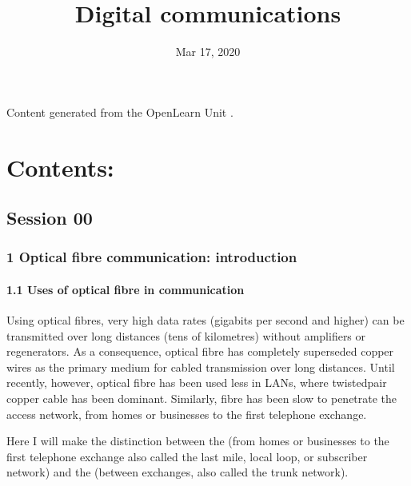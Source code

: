 \documentclass[letterpaper,10pt,english]{sphinxmanual}
\title{Digital communications}
\date{Mar 17, 2020}
\author{}
\begin{document}
\pagestyle{empty}
\sphinxmaketitle
\pagestyle{plain}
\sphinxtableofcontents
\pagestyle{normal}
\label{\detokenize{index::doc}}


Content generated from the OpenLearn Unit .


\chapter{Contents:}
\label{\detokenize{index:contents}}

\section{Session 00}
\label{\detokenize{index:session-00}}

\subsection{1 Optical fibre communication: introduction}
\label{\detokenize{content/session_00/Part_00_01:1-Optical-fibre-communication:-introduction}}\label{\detokenize{content/session_00/Part_00_01::doc}}

\subsubsection{1.1 Uses of optical fibre in communication}
\label{\detokenize{content/session_00/Part_00_01:1.1-Uses-of-optical-fibre-in-communication}}
Using optical fibres, very high data rates (gigabits per second and higher) can be transmitted over long distances (tens of kilometres) without amplifiers or regenerators. As a consequence, optical fibre has completely superseded copper wires as the primary medium for cabled transmission over long distances. Until recently, however, optical fibre has been used less in LANs, where twisted\sphinxhyphen{}pair copper cable has been dominant. Similarly, fibre has been slow to penetrate the access network, from
homes or businesses to the first telephone exchange.

Here I will make the distinction between the  (from homes or businesses to the first telephone exchange \textendash{} also called the last mile, local loop, or subscriber network) and the  (between exchanges, also called the trunk network).
\end{document}
